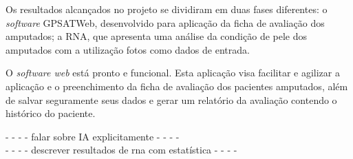 Os resultados alcançados no projeto se dividiram em duas fases diferentes: o \textit{software} GPSATWeb, desenvolvido para aplicação da ficha de avaliação dos amputados; a RNA, que apresenta uma análise da condição de pele dos amputados com a utilização fotos como dados de entrada.

O \textit{software web} está pronto e funcional. Esta aplicação visa facilitar e agilizar a aplicação e o preenchimento da ficha de avaliação dos pacientes amputados, além de salvar seguramente seus dados e gerar um relatório da avaliação contendo o histórico do paciente.




- - - - falar sobre IA explicitamente - - - -  \\
- - - - descrever resultados de rna com estatística - - - -  